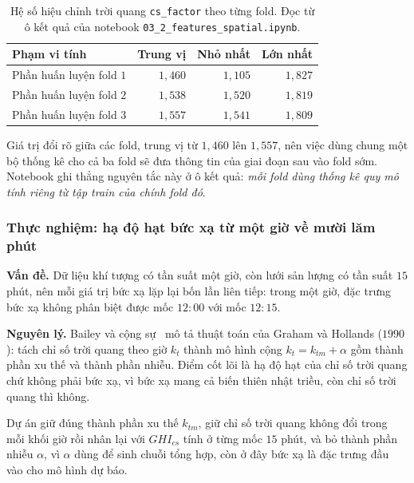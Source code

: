 \documentclass[12pt, a4paper]{report}
\begin{document}
\begin{table}[htbp]
\centering
\caption{Hệ số hiệu chỉnh trời quang \texttt{cs\_factor} theo từng fold. Đọc từ ô kết quả của
notebook \texttt{03\_2\_features\_spatial.ipynb}.}
\label{tab:cs_factor}
\small
\begin{tabular}{l r r r}
\toprule
\textbf{Phạm vi tính} & \textbf{Trung vị} & \textbf{Nhỏ nhất} & \textbf{Lớn nhất} \\
\midrule
Phần huấn luyện fold $1$ & $1{,}460$ & $1{,}105$ & $1{,}827$ \\
Phần huấn luyện fold $2$ & $1{,}538$ & $1{,}520$ & $1{,}819$ \\
Phần huấn luyện fold $3$ & $1{,}557$ & $1{,}541$ & $1{,}809$ \\
\bottomrule
\end{tabular}
\caption[Hệ số hiệu chỉnh trời quang \texttt{cs\_factor} theo từng fold]{Hệ số hiệu chỉnh trời quang \texttt{cs\_factor} theo từng fold. Đọc từ ô kết quả của
notebook \texttt{03\_2\_features\_spatial.ipynb}.}
\label{tab:cs_factor}
\end{table}

Giá trị đổi rõ giữa các fold, trung vị từ $1{,}460$ lên $1{,}557$, nên việc dùng chung
một bộ thống kê cho cả ba fold sẽ đưa thông tin của giai đoạn sau vào fold sớm. Notebook ghi
thẳng nguyên tắc này ở ô kết quả: \textit{mỗi fold dùng thống kê quy mô tính riêng từ tập
train của chính fold đó}.

\subsubsection{Thực nghiệm: hạ độ hạt bức xạ từ một giờ về mười lăm phút}

\textbf{Vấn đề.} Dữ liệu khí tượng có tần suất một giờ, còn lưới sản lượng có tần suất $15$
phút, nên mỗi giá trị bức xạ lặp lại bốn lần liên tiếp: trong một giờ, đặc trưng bức xạ không
phân biệt được mốc $12{:}00$ với mốc $12{:}15$.

\textbf{Nguyên lý.} Bailey và cộng sự~\cite{bailey2024} mô tả thuật toán của Graham và
Hollands ($1990$): tách chỉ số trời quang theo giờ $k_t$ thành mô hình cộng
$k_t = k_{tm} + \alpha$ gồm thành phần xu thế và thành phần nhiễu. Điểm cốt lõi là hạ độ hạt của chỉ số trời quang chứ không phải bức xạ, vì bức xạ mang cả biến thiên nhật
triều, còn chỉ số trời quang thì không.

Dự án giữ đúng thành phần xu thế $k_{tm}$, giữ chỉ số trời quang không đổi trong mỗi khối
giờ rồi nhân lại với $GHI_{cs}$ tính ở từng mốc $15$ phút, và bỏ thành phần nhiễu $\alpha$,
vì $\alpha$ dùng để sinh chuỗi tổng hợp, còn ở đây bức xạ là đặc trưng đầu vào cho mô hình
dự báo.
\end{document}

